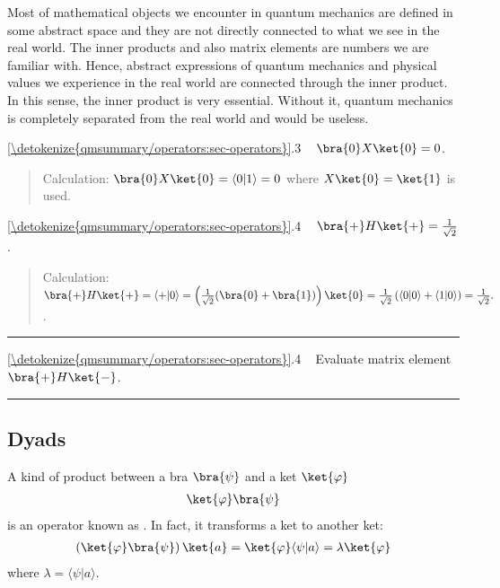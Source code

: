 \documentclass[letterpaper,10pt,english]{jupyterBook}
\begin{document}
\sphinxAtStartPar
Most of mathematical objects we encounter in quantum mechanics are defined in some abstract space and they are not directly connected to what we see in the real world.  The inner products and also matrix elements are numbers we are familiar with.  Hence, abstract expressions of quantum mechanics and physical values we experience in the real world are connected through the inner product.  In this sense, the inner product is very essential.  Without it, quantum mechanics is completely separated from the real world and would be useless.

\sphinxAtStartPar
{} \hyperref[\detokenize{qmsummary/operators:sec-operators}]{\ref{\detokenize{qmsummary/operators:sec-operators}}}.3     \(\bra{0}X\ket{0} = 0\).
\begin{quote}

\sphinxAtStartPar
Calculation: \(\bra{0}X\ket{0} = \langle 0 | 1 \rangle = 0\) where \(X\ket{0} = \ket{1}\) is used.
\end{quote}

\sphinxAtStartPar
{} \hyperref[\detokenize{qmsummary/operators:sec-operators}]{\ref{\detokenize{qmsummary/operators:sec-operators}}}.4     \(\bra{+}H\ket{+} = \frac{1}{\sqrt{2}}\).
\begin{quote}

\sphinxAtStartPar
Calculation: \(\bra{+}H\ket{+} = \langle + | 0 \rangle = \left(\frac{1}{\sqrt{2}}(\bra{0}+\bra{1}) \right) \ket{0} = \frac{1}{\sqrt{2}} \left(\langle 0|0 \rangle + \langle 1|0 \rangle \right)= \frac{1}{\sqrt{2}}.
\).
\end{quote}


\bigskip\hrule\bigskip


\sphinxAtStartPar
{} \hyperref[\detokenize{qmsummary/operators:sec-operators}]{\ref{\detokenize{qmsummary/operators:sec-operators}}}.4     Evaluate matrix element \(\bra{+} H \ket{-}\).


\bigskip\hrule\bigskip



\subsection{Dyads}
\label{\detokenize{qmsummary/operators:dyads}}
\sphinxAtStartPar
A kind of product between a bra \(\bra{\psi}\) and a ket \(\ket{\varphi}\)
\begin{equation*}
\begin{split}
\ket{\varphi} \bra{\psi}
\end{split}
\end{equation*}
\sphinxAtStartPar
is an operator known as .  In fact, it transforms a ket to another ket:
\begin{equation*}
\begin{split} \left(\ket{\varphi}\bra{\psi}\right) \ket{a} = \ket{\varphi} \langle \psi|a \rangle = \lambda \ket{\varphi}
\end{split}
\end{equation*}
\sphinxAtStartPar
where \(\lambda = \langle \psi|a \rangle\).
\end{document}
